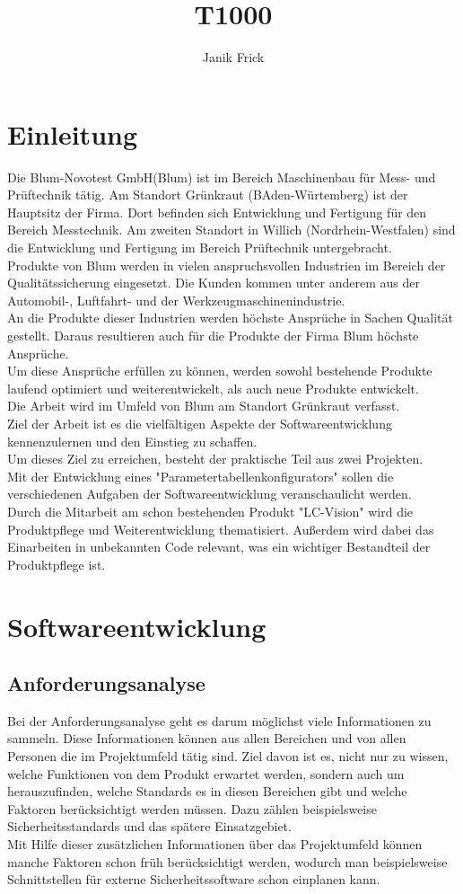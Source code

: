 \documentclass[10pt,a4paper]{article}
\author{Janik Frick}
\title{T1000}
\begin{document}

\tableofcontents
\newpage
\section{Einleitung}
Die Blum-Novotest GmbH(Blum) ist im Bereich Maschinenbau für Mess- und Prüftechnik tätig. Am Standort Grünkraut (BAden-Würtemberg) ist der Hauptsitz der Firma. Dort befinden sich Entwicklung und Fertigung für den Bereich Messtechnik. Am zweiten Standort in Willich (Nordrhein-Westfalen) sind die Entwicklung und Fertigung im Bereich Prüftechnik untergebracht.\\
Produkte von Blum werden in vielen anspruchsvollen Industrien im Bereich der Qualitätssicherung eingesetzt. Die Kunden kommen unter anderem aus der Automobil-, Luftfahrt- und der Werkzeugmaschinenindustrie. \\
An die Produkte dieser Industrien werden höchste Ansprüche in Sachen Qualität gestellt. Daraus resultieren auch für die Produkte der Firma Blum höchste Ansprüche. \\
Um diese Ansprüche erfüllen zu können, werden sowohl bestehende Produkte laufend optimiert und weiterentwickelt, als auch neue Produkte entwickelt. \\
Die Arbeit wird im Umfeld von Blum am Standort Grünkraut verfasst. \\
Ziel der Arbeit ist es die vielfältigen Aspekte der Softwareentwicklung kennenzulernen und den Einstieg zu schaffen.\\
Um dieses Ziel zu erreichen, besteht der praktische Teil aus zwei Projekten.\\
Mit der Entwicklung eines "Parametertabellenkonfigurators" sollen die verschiedenen Aufgaben der Softwareentwicklung veranschaulicht werden.\\
Durch die Mitarbeit am schon bestehenden Produkt "LC-Vision" wird die Produktpflege und Weiterentwicklung thematisiert. 
Außerdem wird dabei das Einarbeiten in unbekannten Code relevant, was ein wichtiger Bestandteil der Produktpflege ist.
\newpage   
\section{Softwareentwicklung}
\subsection{Anforderungsanalyse}
Bei der Anforderungsanalyse geht es darum möglichst viele Informationen zu sammeln. Diese Informationen können aus allen Bereichen und von allen Personen die im Projektumfeld tätig sind. Ziel davon ist es, nicht nur zu wissen, welche Funktionen von dem Produkt erwartet werden, sondern auch um herauszufinden, welche Standards es in diesen Bereichen gibt und welche Faktoren berücksichtigt werden müssen. Dazu zählen beispielsweise Sicherheitsstandards und das spätere Einsatzgebiet. 
\\Mit Hilfe dieser zusätzlichen Informationen über das Projektumfeld können manche Faktoren schon früh berücksichtigt werden, wodurch man beispielsweise Schnittstellen für externe Sicherheitssoftware schon einplanen kann.
\end{document}
